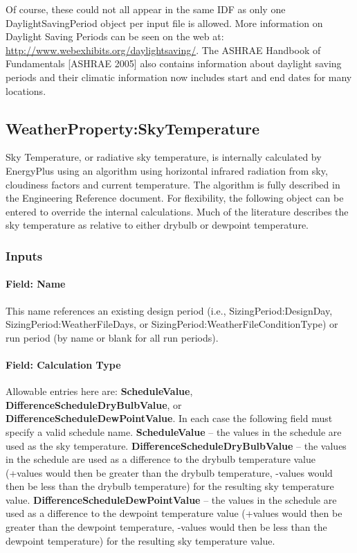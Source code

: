Of course, these could not all appear in the same IDF as only one DaylightSavingPeriod object per input file is allowed. More information on Daylight Saving Periods can be seen on the web at: \url{http://www.webexhibits.org/daylightsaving/}. The ASHRAE Handbook of Fundamentals {[}ASHRAE 2005{]} also contains information about daylight saving periods and their climatic information now includes start and end dates for many locations.

\subsection{WeatherProperty:SkyTemperature}\label{weatherpropertyskytemperature}

Sky Temperature, or radiative sky temperature, is internally calculated by EnergyPlus using an algorithm using horizontal infrared radiation from sky, cloudiness factors and current temperature. The algorithm is fully described in the Engineering Reference document. For flexibility, the following object can be entered to override the internal calculations. Much of the literature describes the sky temperature as relative to either drybulb or dewpoint temperature.

\subsubsection{Inputs}\label{inputs-8-011}

\paragraph{Field: Name}\label{field-name-7-009}

This name references an existing design period (i.e., SizingPeriod:DesignDay, SizingPeriod:WeatherFileDays, or SizingPeriod:WeatherFileConditionType) or run period (by name or blank for all run periods).

\paragraph{Field: Calculation Type}\label{field-calculation-type}

Allowable entries here are: \textbf{ScheduleValue}, \textbf{DifferenceScheduleDryBulbValue}, or \textbf{DifferenceScheduleDewPointValue}. In each case the following field must specify a valid schedule name. \textbf{ScheduleValue} -- the values in the schedule are used as the sky temperature. \textbf{DifferenceScheduleDryBulbValue} -- the values in the schedule are used as a difference to the drybulb temperature value (+values would then be greater than the drybulb temperature, -values would then be less than the drybulb temperature) for the resulting sky temperature value. \textbf{DifferenceScheduleDewPointValue} -- the values in the schedule are used as a difference to the dewpoint temperature value (+values would then be greater than the dewpoint temperature, -values would then be less than the dewpoint temperature) for the resulting sky temperature value.

